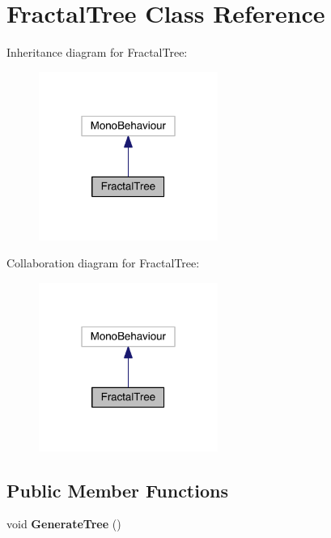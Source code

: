 \hypertarget{class_fractal_tree}{}\section{Fractal\+Tree Class Reference}
\label{class_fractal_tree}


Inheritance diagram for Fractal\+Tree\+:\nopagebreak
\begin{figure}[H]
\begin{center}
\leavevmode
\includegraphics[width=166pt]{class_fractal_tree__inherit__graph}
\end{center}
\end{figure}


Collaboration diagram for Fractal\+Tree\+:\nopagebreak
\begin{figure}[H]
\begin{center}
\leavevmode
\includegraphics[width=166pt]{class_fractal_tree__coll__graph}
\end{center}
\end{figure}
\subsection*{Public Member Functions}
\begin{DoxyCompactItemize}
\item 
void {\bfseries Generate\+Tree} ()\hypertarget{class_fractal_tree_a5801da70e10bbbc32f4e558b31a966dc}{}\label{class_fractal_tree_a5801da70e10bbbc32f4e558b31a966dc}

\end{DoxyCompactItemize}
